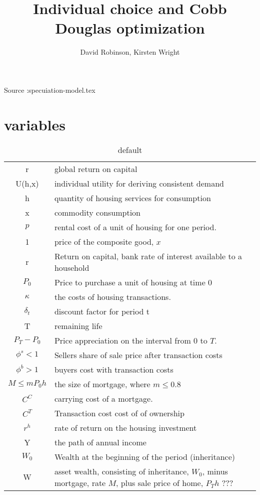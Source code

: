 \documentclass[11pt]{amsart}
\title{Individual choice and Cobb Douglas optimization}
\author{David Robinson, Kirsten Wright}
\begin{document}
\maketitle
Source :specuiation-model.tex
\section{variables}


\begin{table}[htp]
\caption{default}
\begin{center}
\begin{tabular}{cp{8cm}}
r& global return on capital\\
U(h,x)  & individual utility for deriving consistent demand\\
 h	 &quantity of housing services for consumption \\
x     	&commodity consumption\\
$p$ 	& rental cost of a unit of housing for one period. \\%
 1			&price of the composite good, $x$\\ 
 r			& Return on capital, bank rate of interest available to a household\\
$P_{0}$ 		& Price to purchase a unit of housing at time $0$ \\
 $\kappa$ & the costs of housing transactions.\\
 $\delta_t$& discount factor for period t\\
T 			& remaining life\\
 $P_T-P_0$	&Price appreciation on the interval from 0 to $T$.\\
$\phi^s<1$	&Sellers share of sale price after transaction costs\\
$\phi^b>1$	&buyers cost with transaction costs\\
 $M\leq mP_0h$ 	&the size of mortgage, where $m\leq 0.8$\\
$C^C $&carrying cost of a mortgage. \\
$C^T$&Transaction cost cost of of ownership \\
$r^h$&rate of  return on the housing investment\\	
  Y & the path of annual income\\
$W_0$& Wealth at the beginning of the period (inheritance)\\
W&asset wealth, consisting of inheritance, $W_0$, minus mortgage, rate $M$,  plus sale price of home,  $P_Th$  ??? \\
\end{tabular}
\end{center}
\label{default}
\end{table}%
\end{document}
